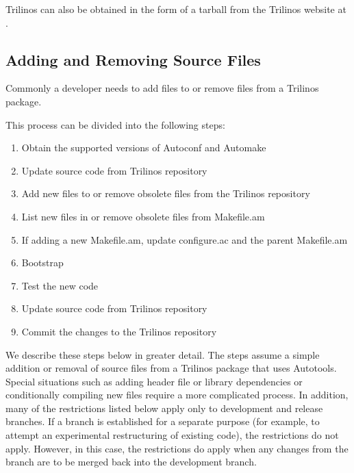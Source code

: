 \documentclass[12pt,relax]{TrilinosDevGuide}
\begin{document}
Trilinos can also be obtained in the form of a tarball from the Trilinos 
website at 
.  



\subsection{Adding and Removing Source Files}
\label{Subsection:AddSource}

Commonly a developer needs to add files to or remove files from a Trilinos 
package.  

This process can be divided into the following steps:

\begin{enumerate}
\item Obtain the supported versions of Autoconf and Automake
\item Update source code from Trilinos repository
\item Add new files to or remove obsolete files from the Trilinos repository
\item List new files in or remove obsolete files from Makefile.am
\item If adding a new Makefile.am, update configure.ac and the parent 
Makefile.am
\item Bootstrap
\item Test the new code
\item Update source code from Trilinos repository
\item Commit the changes to the Trilinos repository
\end{enumerate}

We describe these steps below in greater detail.  The steps assume a simple 
addition or removal of source files from a Trilinos package that uses 
Autotools.  Special situations such as adding header file or library 
dependencies or conditionally compiling new files require a more complicated 
process.  In addition, many of the restrictions listed below apply only to 
development and release branches.  If a branch is 
established for a separate purpose (for example, to attempt an experimental 
restructuring of existing code), the restrictions do not apply.  However, in 
this case, the restrictions do apply when any changes from the branch are to 
be merged back into the development branch.  
\end{document}
